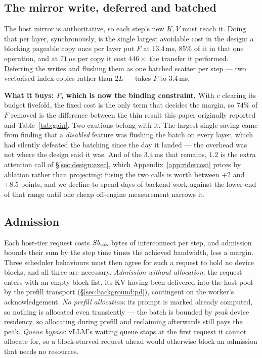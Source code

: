 \subsection{The mirror write, deferred and batched}
\label{sec:design:mirror}

The host mirror is authoritative, so each step's new $K,V$ must reach it. Doing
that per layer, synchronously, is the single largest avoidable cost in the design:
a blocking pageable copy once per layer put $F$ at $13.4$\,ms, $85\%$ of it in that
one operation, and at $71\,\mu$s per copy it cost $446\times$ the transfer it
performed. Deferring the writes and flushing them as one batched scatter per step
--- two vectorised index-copies rather than $2L$ --- takes $F$ to $3.4$\,ms.

\textbf{What it buys: $F$, which is now the binding constraint.} With $c$ clearing
its budget fivefold, the fixed cost is the only term that decides the margin, so
$74\%$ of $F$ removed is the difference between the thin result this paper
originally reported and Table~\ref{tab:gain}. Two cautions belong with it. The
largest single saving came from finding that a \emph{disabled} feature was flushing
the batch on every layer, which had silently defeated the batching since the day it
landed --- the overhead was not where the design said it was. And of the $3.4$\,ms
that remains, $1.2$ is the extra attention call of \S\ref{sec:design:exec}, which
Appendix~\ref{app:ridercost} prices by ablation rather than projecting: fusing the
two calls is worth between $+2$ and $+8.5$ points, and we decline to spend days of
backend work against the lower end of that range until one cheap off-engine
measurement narrows it.

\subsection{Admission}
\label{sec:design:admission}

Each host-tier request costs $Sb_{\mathrm{tok}}$ bytes of interconnect per step, and
admission bounds their sum by the step time times the achieved bandwidth, less a
margin. Three scheduler behaviours must then agree for such a request to hold no
device blocks, and all three are necessary. \emph{Admission without allocation}:
the request enters with an empty block list, its KV having been delivered into
the host pool by the prefill transport (\S\ref{sec:background:pd}), contingent on
the worker's acknowledgement. \emph{No prefill allocation}: its prompt is marked
already computed, so nothing is allocated even transiently --- the batch is
bounded by \emph{peak} device residency, so allocating during prefill and
reclaiming afterwards still pays the peak. \emph{Queue bypass}: vLLM's waiting
queue stops at the first request it cannot allocate for, so a block-starved
request ahead would otherwise block an admission that needs no resources.

